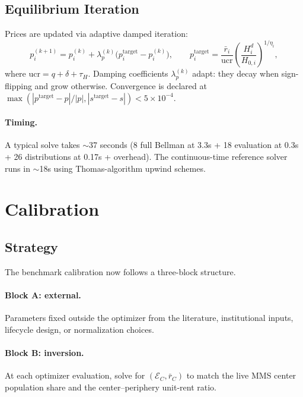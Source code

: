 \documentclass[11pt]{article}
\begin{document}
\subsection{Equilibrium Iteration}

Prices are updated via adaptive damped iteration:
\begin{equation}
p_i^{(k+1)} = p_i^{(k)} + \lambda_p^{(k)} \big(p_i^{\text{target}} - p_i^{(k)}\big), \qquad
p_i^{\text{target}} = \frac{\bar r_i}{\text{ucr}} \left(\frac{H_i^d}{H_{0,i}}\right)^{1/\eta_i},
\end{equation}
where $\text{ucr} = q + \delta + \tau_H$. Damping coefficients $\lambda_p^{(k)}$ adapt: they decay when sign-flipping and grow otherwise. Convergence is declared at $\max(|p^{\text{target}} - p|/|p|, |s^{\text{target}} - s|) < 5 \times 10^{-4}$.

\paragraph{Timing.} A typical solve takes $\sim$37 seconds (8 full Bellman at 3.3s + 18 evaluation at 0.3s + 26 distributions at 0.17s + overhead). The continuous-time reference solver runs in $\sim$18s using Thomas-algorithm upwind schemes.

\clearpage
\section{Calibration}
\label{sec:calibration}

\subsection{Strategy}

The benchmark calibration now follows a three-block structure.

\paragraph{Block A: external.} Parameters fixed outside the optimizer from the literature, institutional inputs, lifecycle design, or normalization choices.

\paragraph{Block B: inversion.} At each optimizer evaluation, solve for $(\mathcal E_C, \bar r_C)$ to match the live MMS center population share and the center--periphery unit-rent ratio.
\end{document}
